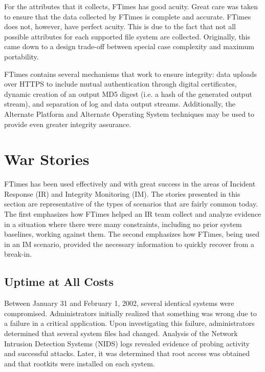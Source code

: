 \documentclass[10pt]{article}
\begin{document}
For the attributes that it collects, FTimes has good acuity.  Great
care was taken to ensure that the data collected by FTimes is
complete and accurate.  FTimes does not, however, have perfect
acuity.  This is due to the fact that not all possible attributes
for each supported file system are collected.  Originally, this
came down to a design trade-off between special case complexity
and maximum portability.

FTimes contains several mechanisms that work to ensure integrity:
data uploads over HTTPS to include mutual authentication through
digital certificates, dynamic creation of an output MD5 digest
(i.e. a hash of the generated output stream), and separation of
log and data output streams.  Additionally, the Alternate Platform
and Alternate Operating System techniques may be used to provide
even greater integrity assurance.

\section{War Stories}

FTimes has been used effectively and with great success in the
areas of Incident Response (IR) and Integrity Monitoring (IM).
The stories presented in this section are representative of the
types of scenarios that are fairly common today.  The first emphasizes
how FTimes helped an IR team collect and analyze evidence in a
situation where there were many constraints, including no prior
system baselines, working against them.  The second emphasizes how
FTimes, being used in an IM scenario, provided the necessary
information to quickly recover from a break-in.

\subsection{Uptime at All Costs}

Between January 31 and February 1, 2002, several identical systems
were compromised.  Administrators initially realized that something
was wrong due to a failure in a critical application.  Upon
investigating this failure, administrators determined that several
system files had changed.  Analysis of the Network Intrusion
Detection Systems (NIDS) logs revealed evidence of probing activity
and successful attacks.  Later, it was determined that root access
was obtained and that rootkits were installed on each system.
\end{document}
